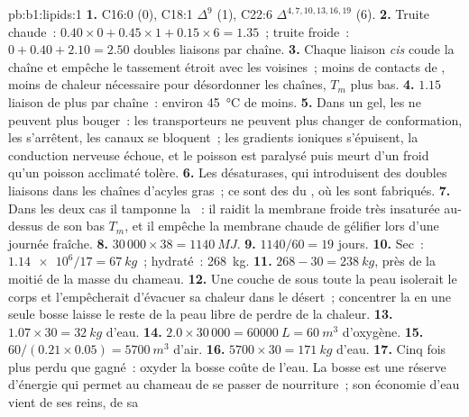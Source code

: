 \begin{solution}{pb:b1:lipids:1}
\textbf{1.} C16:0 (0), C18:1 $\Delta^9$ (1), C22:6 $\Delta^{4,7,10,13,16,19}$
(6).
\textbf{2.} Truite chaude~: $0.40\times 0 + 0.45\times 1 + 0.15\times 6 = 1.35$~;
truite froide~: $0 + 0.40 + 2.10 = 2.50$ doubles liaisons par chaîne.
\textbf{3.} Chaque liaison \emph{cis} coude la chaîne et empêche le
tassement étroit avec les voisines~; moins de contacts de ,
moins de chaleur nécessaire pour désordonner les chaînes, $T_m$ plus
bas.
\textbf{4.} $1.15$ liaison de plus par chaîne~: environ
\qty{45}{\celsius} de moins.
\textbf{5.} Dans un gel, les  ne peuvent plus bouger~: les
transporteurs ne peuvent plus changer de conformation, les 
s'arrêtent, les canaux se bloquent~; les gradients ioniques
s'épuisent, la conduction nerveuse échoue, et le poisson est paralysé
puis meurt d'un froid qu'un poisson acclimaté tolère.
\textbf{6.} Les désaturases, qui introduisent des doubles liaisons dans
les chaînes d'acyles gras~; ce sont des  du
, où les  sont fabriqués.
\textbf{7.} Dans les deux cas il tamponne la ~: il raidit la
membrane froide très insaturée au-dessus de son bas $T_m$, et il empêche
la membrane chaude de gélifier lors d'une journée fraîche.
\textbf{8.} $30\,000\times 38 = \qty{1140}{MJ}$.
\textbf{9.} $1140/60 = 19$ jours.
\textbf{10.} Sec~: $\num{1.14e6}/17 = \qty{67}{kg}$~; hydraté~:
\qty{268}{kg}.
\textbf{11.} $268 - 30 = \qty{238}{kg}$, près de la moitié de la masse
du chameau.
\textbf{12.} Une couche de  sous toute la peau isolerait le corps
et l'empêcherait d'évacuer sa chaleur dans le désert~; concentrer la
 en une seule bosse laisse le reste de la peau libre de perdre de
la chaleur.
\textbf{13.} $1.07\times 30 = \qty{32}{kg}$ d'eau.
\textbf{14.} $2.0\times 30\,000 = \qty{60000}{L} = \qty{60}{m^3}$
d'oxygène.
\textbf{15.} $60/(0.21\times 0.05) = \qty{5700}{m^3}$ d'air.
\textbf{16.} $5700\times 30 = \qty{171}{kg}$ d'eau.
\textbf{17.} Cinq fois plus perdu que gagné~: oxyder la bosse coûte de
l'eau. La bosse est une réserve d'énergie qui permet au chameau de se
passer de nourriture~; son économie d'eau vient de ses reins, de sa

\end{solution}
